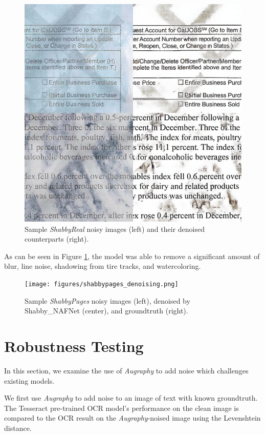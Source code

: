 \documentclass[runningheads]{llncs}
\begin{document}
\begin{figure}
\centering
\includegraphics[width=0.9\columnwidth]{figures/shabbyreal_denoised.png}
\caption{Sample \emph{ShabbyReal} noisy images (left) and their denoised counterparts (right).}
\label{fig:shabbyreal_denoised}
\end{figure}

As can be seen in Figure \ref{fig:shabbyreal_denoised}, the model was able to remove a significant amount of blur, line noise, shadowing from tire tracks, and watercoloring.

\begin{figure}
\centering
\texttt{[image: figures/shabbypages\_denoising.png]}
\caption{Sample \emph{ShabbyPages} noisy images (left), denoised by Shabby\_NAFNet (center), and groundtruth (right).}
\label{fig:shabbypages_denoising}
\end{figure}

\section{Robustness Testing}
In this section, we examine the use of \emph{Augraphy} to add noise which challenges existing models.

We first use \emph{Augraphy} to add noise to an image of text with known groundtruth.
The Tesseract \cite{ref_tesseract} pre-trained OCR model's performance on the clean image is compared to the OCR result on the \emph{Augraphy}-noised image using the Levenshtein distance.
\end{document}

